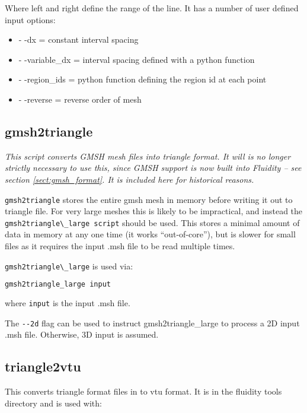 Where left and right define the range of the line. It has a number of user defined input options:

\begin{itemize}
\item - -dx = constant interval spacing
\item - -variable\_dx = interval spacing defined with a python function
\item - -region\_ids = python function defining the region id at each point
\item - -reverse = reverse order of mesh
\end{itemize}



\subsection{gmsh2triangle}

\textit{This script converts GMSH mesh files into triangle format. It will is no longer strictly necessary to use this, since GMSH support is now built into Fluidity -- see section \ref{sect:gmsh_format}. It is included here for historical reasons.}

\lstinline[language=Bash]{gmsh2triangle} stores the entire gmsh mesh in memory before writing it out to
triangle file. For very large meshes this is likely to be impractical,
and instead the \lstinline[language=Bash]{gmsh2triangle\_large script}
should be used. This stores a minimal
amount of data in memory at any one time (it works ``out-of-core''), but
is slower for small files as it requires the input .msh file to be read multiple
times.

\lstinline[language=Bash]{gmsh2triangle\_large} is used via:

\begin{lstlisting}[language = Bash]
gmsh2triangle_large input
\end{lstlisting}

where \lstinline[language = Bash]*input* is the input .msh file.

The \lstinline[language = Bash]+--2d+ flag can be used to instruct gmsh2triangle\_large
to process a 2D input .msh file. Otherwise, 3D input is assumed.

\subsection{triangle2vtu}
This converts triangle format files in to vtu format. It is in the fluidity tools directory and is used with:

